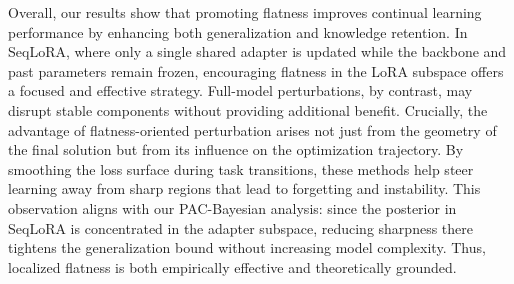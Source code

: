 \documentclass[letterpaper]{article} %
\begin{document}
Overall, our results show that promoting flatness improves continual learning performance by enhancing both generalization and knowledge retention. In SeqLoRA, where only a single shared adapter is updated while the backbone and past parameters remain frozen, encouraging flatness in the LoRA subspace offers a focused and effective strategy. Full-model perturbations, by contrast, may disrupt stable components without providing additional benefit. Crucially, the advantage of flatness-oriented perturbation arises not just from the geometry of the final solution but from its influence on the optimization trajectory. By smoothing the loss surface during task transitions, these methods help steer learning away from sharp regions that lead to forgetting and instability. This observation aligns with our PAC-Bayesian analysis: since the posterior in SeqLoRA is concentrated in the adapter subspace, reducing sharpness there tightens the generalization bound without increasing model complexity. Thus, localized flatness is both empirically effective and theoretically grounded.



\end{document}
